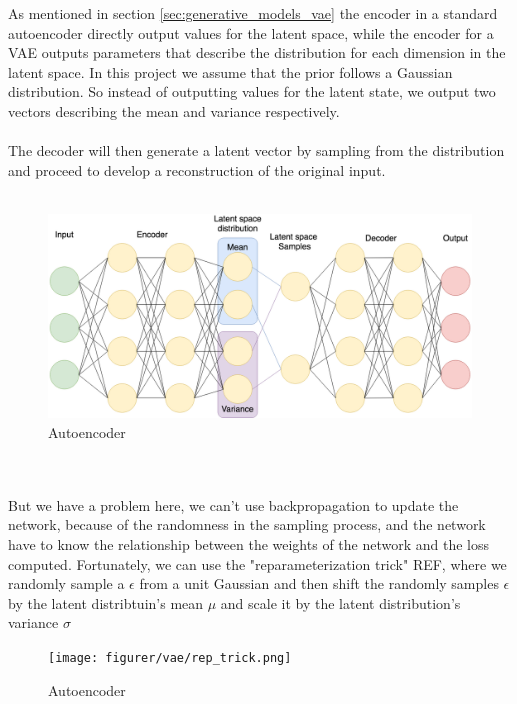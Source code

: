 \documentclass[11pt]{article}
\begin{document}
As mentioned in section \ref{sec:generative_models_vae} the encoder in a standard autoencoder directly output values for the latent space, while the encoder for a VAE outputs parameters that describe the distribution for each dimension in the latent space. In this project we assume that the prior follows a Gaussian distribution. So instead of outputting values for the latent state, we output two vectors describing the mean and variance respectively.
\\ \\
The decoder will then generate a latent vector by sampling from the distribution and proceed to develop a reconstruction of the original input.
\\ \\
\begin{figure}[!h]
    \centering
    \includegraphics[scale=0.35]{figurer/vae/vae_network.png}
    \caption{Autoencoder}
    \label{fig:generative_models_vae_implementation}
\end{figure}
\\ \\
But we have a problem here, we can't use backpropagation to update the network, because of the randomness in the sampling process, and the network have to know the relationship between the weights of the network and the loss computed.  Fortunately, we can use the "reparameterization trick" REF, where we randomly sample a $\epsilon$ from a unit Gaussian and then shift the randomly samples $\epsilon$ by the latent distribtuin's mean $\mu$ and scale it by the latent distribution's variance $\sigma$


\begin{figure}[!h]
    \centering
    \texttt{[image: figurer/vae/rep\_trick.png]}
    \caption{Autoencoder}
    \label{fig:generative_models_rep_trick}
\end{figure}
\end{document}
